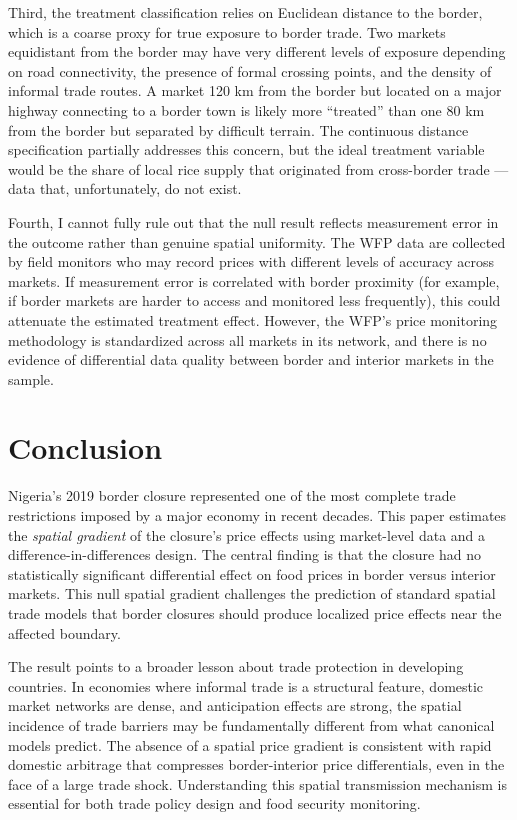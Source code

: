 \documentclass[12pt]{article}
\begin{document}
Third, the treatment classification relies on Euclidean distance to the border, which is a coarse proxy for true exposure to border trade. Two markets equidistant from the border may have very different levels of exposure depending on road connectivity, the presence of formal crossing points, and the density of informal trade routes. A market 120 km from the border but located on a major highway connecting to a border town is likely more ``treated'' than one 80 km from the border but separated by difficult terrain. The continuous distance specification partially addresses this concern, but the ideal treatment variable would be the share of local rice supply that originated from cross-border trade --- data that, unfortunately, do not exist.

Fourth, I cannot fully rule out that the null result reflects measurement error in the outcome rather than genuine spatial uniformity. The WFP data are collected by field monitors who may record prices with different levels of accuracy across markets. If measurement error is correlated with border proximity (for example, if border markets are harder to access and monitored less frequently), this could attenuate the estimated treatment effect. However, the WFP's price monitoring methodology is standardized across all markets in its network, and there is no evidence of differential data quality between border and interior markets in the sample.


\section{Conclusion}
\label{sec:conclusion}

Nigeria's 2019 border closure represented one of the most complete trade restrictions imposed by a major economy in recent decades. This paper estimates the \emph{spatial gradient} of the closure's price effects using market-level data and a difference-in-differences design. The central finding is that the closure had no statistically significant differential effect on food prices in border versus interior markets. This null spatial gradient challenges the prediction of standard spatial trade models that border closures should produce localized price effects near the affected boundary.

The result points to a broader lesson about trade protection in developing countries. In economies where informal trade is a structural feature, domestic market networks are dense, and anticipation effects are strong, the spatial incidence of trade barriers may be fundamentally different from what canonical models predict. The absence of a spatial price gradient is consistent with rapid domestic arbitrage that compresses border-interior price differentials, even in the face of a large trade shock. Understanding this spatial transmission mechanism is essential for both trade policy design and food security monitoring.
\end{document}
